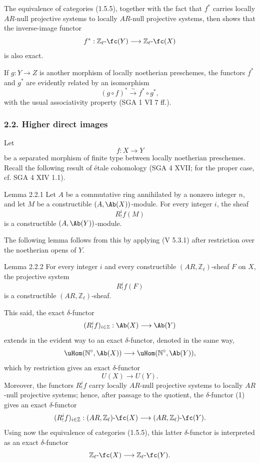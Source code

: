 The equivalence of categories (1.5.5), together with the fact that \(f^*\) carries locally \(AR\)-null projective systems to locally \(AR\)-null projective systems, then shows that the inverse-image functor
\[
f^*:\mathbb Z_\ell\text{-}\fc(Y)\longrightarrow \mathbb Z_\ell\text{-}\fc(X)
\]
is also exact.

If \(g:Y\to Z\) is another morphism of locally noetherian preschemes, the functors \(f^*\) and \(g^*\) are evidently related by an isomorphism
\[
(g\circ f)^*\xrightarrow{\sim}f^*\circ g^*,
\]
with the usual associativity property (SGA 1 VI 7 ff.).

\subsubsection*{2.2. Higher direct images}

Let
\[
f:X\longrightarrow Y
\]
be a separated morphism of finite type between locally noetherian preschemes. Recall the following result of étale cohomology (SGA 4 XVII; for the proper case, cf. SGA 4 XIV 1.1).

\begin{statement}{Lemma 2.2.1}
Let \(A\) be a commutative ring annihilated by a nonzero integer \(n\), and let \(M\) be a constructible \((A,\Ab(X))\)-module. For every integer \(i\), the sheaf
\[
R^i_!f(M)
\]
is a constructible \((A,\Ab(Y))\)-module.
\end{statement}

The following lemma follows from this by applying (V 5.3.1) after restriction over the noetherian opens of \(Y\).

\begin{statement}{Lemma 2.2.2}
For every integer \(i\) and every constructible \((AR,\mathbb Z_\ell)\)-sheaf \(F\) on \(X\), the projective system
\[
R^i_!f(F)
\]
is a constructible \((AR,\mathbb Z_\ell)\)-sheaf.
\end{statement}

This said, the exact \(\delta\)-functor
\[
(R^i_!f)_{i\in\mathbb Z}:\Ab(X)\longrightarrow \Ab(Y)
\]
extends in the evident way to an exact \(\delta\)-functor, denoted in the same way,
\[
\uHom(\mathbb N^\circ,\Ab(X))\longrightarrow \uHom(\mathbb N^\circ,\Ab(Y)),
\]
which by restriction gives an exact \(\delta\)-functor
\[
U(X)\longrightarrow U(Y).
\tag{1}
\]
Moreover, the functors \(R^i_!f\) carry locally \(AR\)-null projective systems to locally \(AR\)-null projective systems; hence, after passage to the quotient, the \(\delta\)-functor (1) gives an exact \(\delta\)-functor
\[
(R^i_!f)_{i\in\mathbb Z}:(AR,\mathbb Z_\ell)\text{-}\fc(X)
\longrightarrow (AR,\mathbb Z_\ell)\text{-}\fc(Y).
\]
Using now the equivalence of categories (1.5.5), this latter \(\delta\)-functor is interpreted as an exact \(\delta\)-functor
\[
\mathbb Z_\ell\text{-}\fc(X)\longrightarrow \mathbb Z_\ell\text{-}\fc(Y).
\]

